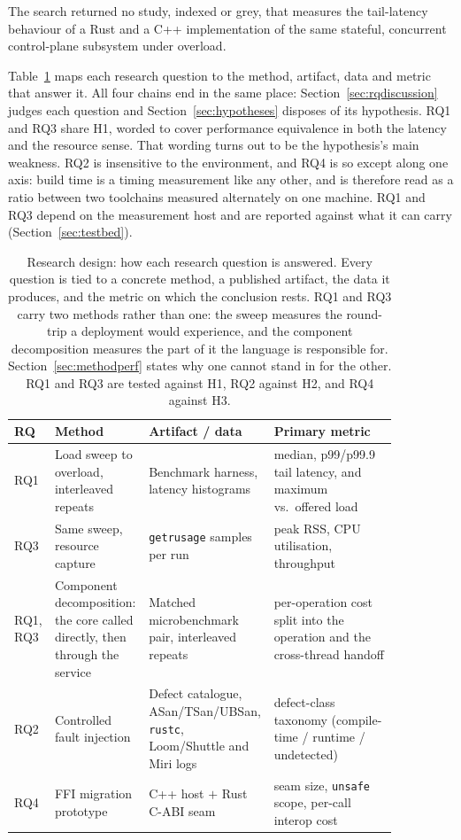\documentclass[english,oneside,a4paper,censored,csm,software-track-2020]{HYthesisML}
\renewcommand{\arraystretch}{0.95}
\begin{document}
The search returned no study, indexed or grey, that measures the tail-latency behaviour of a
Rust and a C++ implementation of the same stateful, concurrent control-plane subsystem under
overload.

Table~\ref{tab:design} maps each research question to the method, artifact, data and metric that
answer it. All four chains end in the same place: Section~\ref{sec:rqdiscussion} judges each
question and Section~\ref{sec:hypotheses} disposes of its hypothesis. RQ1 and RQ3 share H1,
worded to cover performance equivalence in both the latency and the resource sense. That wording
turns out to be the hypothesis's main weakness. RQ2 is insensitive to the environment, and RQ4 is
so except along one axis: build time is a timing measurement like any other, and is therefore read
as a ratio between two toolchains measured alternately on one machine. RQ1 and RQ3 depend on the
measurement host and are reported against what it can carry (Section~\ref{sec:testbed}).

\begin{table}[H]
\centering
\caption[Research design: how each research question is answered]{Research design: how each research question is answered. Every question is tied to a
concrete method, a published artifact, the data it produces, and the metric on which the
conclusion rests. RQ1 and RQ3 carry two methods rather than one: the sweep measures the
round-trip a deployment would experience, and the component decomposition measures the part of
it the language is responsible for. Section~\ref{sec:methodperf} states why one cannot stand in
for the other. RQ1 and RQ3 are tested against H1, RQ2 against H2, and RQ4 against
H3.\label{tab:design}}
\renewcommand{\arraystretch}{1.25}
\begin{tabular}{@{}p{0.06\linewidth} p{0.24\linewidth} p{0.24\linewidth} p{0.32\linewidth}@{}}
\hline\hline
RQ & Method & Artifact / data & Primary metric \\
\hline
RQ1 & Load sweep to overload, interleaved repeats & Benchmark harness, latency histograms &
median, p99/p99.9 tail latency, and maximum vs.\ offered load \\
RQ3 & Same sweep, resource capture & \texttt{getrusage} samples per run &
peak RSS, CPU utilisation, throughput \\
RQ1, RQ3 & Component decomposition: the core called directly, then through the service &
Matched microbenchmark pair, interleaved repeats &
per-operation cost split into the operation and the cross-thread handoff \\
RQ2 & Controlled fault injection & Defect catalogue, ASan/TSan/UBSan, \texttt{rustc},
Loom/Shuttle and Miri logs &
defect-class taxonomy (compile-time / runtime / undetected) \\
RQ4 & FFI migration prototype & C++ host $+$ Rust C-ABI seam &
seam size, \texttt{unsafe} scope, per-call interop cost \\
\hline
\end{tabular}
\end{table}
\end{document}

